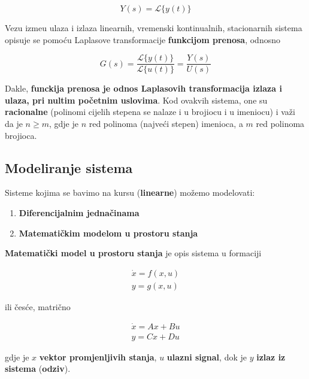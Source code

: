 \documentclass[12pt]{IEEEtran}
\numberwithin{equation}{subsection}
\numberwithin{figure}{section}
\begin{document}
\begin{equation}
    Y(s) = \mathcal{L}\{y(t)\}
\end{equation}

Vezu izme\dj{}u ulaza i izlaza linearnih, vremenski kontinualnih, stacionarnih sistema opisuje se pomo\'{c}u
Laplasove transformacije \textbf{funkcijom prenosa}, odnosno

\begin{equation}
    G(s) = \frac{\mathcal{L}\{y(t)\}}{\mathcal{L}\{u(t)\}} = \frac{Y(s)}{U(s)}
\end{equation}

Dakle, \textbf{funckija prenosa je odnos Laplasovih transformacija izlaza i ulaza,
    pri nultim po\v{c}etnim uslovima}. Kod ovakvih sistema, one su \textbf{racionalne} (polinomi cijelih stepena se nalaze
i u brojiocu i u imeniocu) i va\v{z}i da je $n \geq m$, gdje je $n$ red polinoma (najve\'{c}i stepen) imenioca,
a $m$ red polinoma brojioca.

\subsection{\textbf{Modeliranje sistema}}
Sisteme kojima se bavimo na kursu (\textbf{linearne}) mo\v{z}emo modelovati:

\begin{enumerate}
    \item \textbf{Diferencijalnim jedna\v{c}inama}
    \item \textbf{Matemati\v{c}kim modelom u prostoru stanja}
\end{enumerate}

\vspace{12pt}

\textbf{Matemati\v{c}ki model u prostoru stanja} je opis sistema u formaciji

\begin{gather}
    \dot{x} = f(x, u)\\
    y = g(x, u)
\end{gather}

ili \v{c}es\'{c}e, matri\v{c}no

\begin{gather}
    \dot{x} = Ax + Bu\\
    y = Cx + Du
\end{gather}

gdje je $x$ \textbf{vektor promjenljivih stanja}, $u$ \textbf{ulazni signal},
dok je $y$ \textbf{izlaz iz sistema} (\textbf{odziv}).
\end{document}
